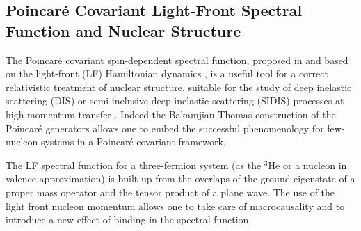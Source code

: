 \subsection{Poincar\'e Covariant Light-Front Spectral Function and Nuclear Structure}
{The Poincar\'e covariant spin-dependent spectral function, proposed in \cite{PhysRevC.95.014001, Pace:2013bq,Scopetta:2014yoa, Pace:2016eiq} and based on  the light-front (LF) Hamiltonian dynamics \cite{Dirac:1949cp, Keister:1991sb},  is a useful tool for a correct relativistic treatment  of nuclear structure, suitable for the study of deep inelastic scattering (DIS) or semi-inclusive deep inelastic scattering (SIDIS) processes at high momentum transfer \cite{mar,sid1,sid2}.}
 {Indeed the Bakamjian-Thomas construction \cite{Bakamjian:1953kh} of the Poincar\'e generators 
  allows one to embed the successful phenomenology for few-nucleon systems in a
Poincar\'e covariant framework.}

The LF spectral function for a three-fermion system  (as the $^3\mathrm{He}$ or a nucleon in valence approximation) is built up from the overlaps of the ground eigenstate of a proper mass operator \cite{PhysRevC.95.014001, Pace:2013bq,Scopetta:2014yoa, Pace:2016eiq} and 
the tensor product of a plane wave.
{{The use of the light front nucleon momentum 
   allows one  to take care of macrocausality \cite{Keister:1991sb} and  to introduce 
   {{a new effect of binding in the spectral function.}}}}

